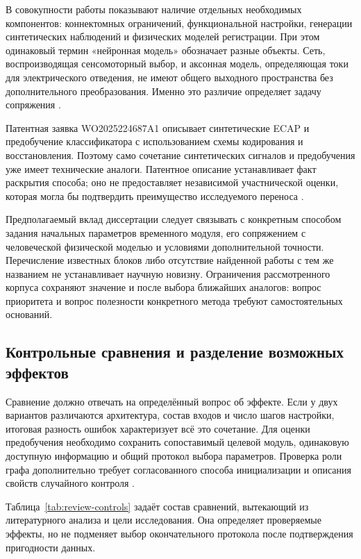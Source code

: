 В совокупности работы показывают наличие отдельных необходимых компонентов: коннектомных ограничений, функциональной настройки, генерации синтетических наблюдений и физических моделей регистрации. При этом одинаковый термин «нейронная модель» обозначает разные объекты. Сеть, воспроизводящая сенсомоторный выбор, и аксонная модель, определяющая токи для электрического отведения, не имеют общего выходного пространства без дополнительного преобразования. Именно это различие определяет задачу сопряжения \cite{s744,s775,ecapmodel}.

Патентная заявка WO2025224687A1 описывает синтетические ECAP и предобучение классификатора с использованием схемы кодирования и восстановления. Поэтому само сочетание синтетических сигналов и предобучения уже имеет технические аналоги. Патентное описание устанавливает факт раскрытия способа; оно не предоставляет независимой участнической оценки, которая могла бы подтвердить преимущество исследуемого переноса \cite{s746}.

Предполагаемый вклад диссертации следует связывать с конкретным способом задания начальных параметров временного модуля, его сопряжением с человеческой физической моделью и условиями дополнительной точности. Перечисление известных блоков либо отсутствие найденной работы с тем же названием не устанавливает научную новизну. Ограничения рассмотренного корпуса сохраняют значение и после выбора ближайших аналогов: вопрос приоритета и вопрос полезности конкретного метода требуют самостоятельных оснований.

\subsection{Контрольные сравнения и разделение возможных эффектов}

Сравнение должно отвечать на определённый вопрос об эффекте. Если у двух вариантов различаются архитектура, состав входов и число шагов настройки, итоговая разность ошибок характеризует всё это сочетание. Для оценки предобучения необходимо сохранить сопоставимый целевой модуль, одинаковую доступную информацию и общий протокол выбора параметров. Проверка роли графа дополнительно требует согласованного способа инициализации и описания свойств случайного контроля \cite{s741,s743}.

Таблица~\ref{tab:review-controls} задаёт состав сравнений, вытекающий из литературного анализа и цели исследования. Она определяет проверяемые эффекты, но не подменяет выбор окончательного протокола после подтверждения пригодности данных.

